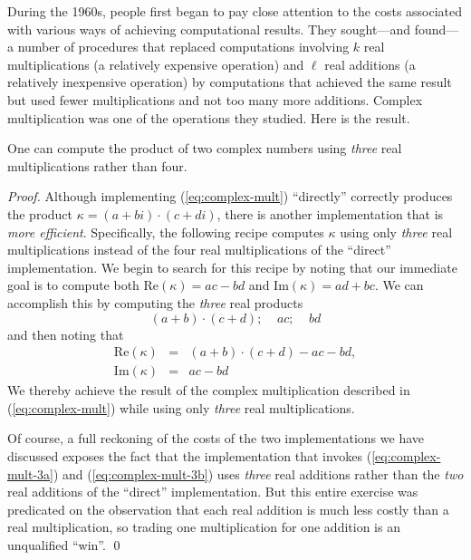 During the 1960s, people first began to pay close attention to the
costs associated with various ways of achieving computational results.
They sought---and found---a number of procedures that replaced
computations involving $k$ real multiplications (a relatively
expensive operation) and $\ell$ real additions (a relatively
inexpensive operation) by computations that achieved the same result
but used fewer multiplications and not too many more additions.
Complex multiplication was one of the operations they studied.  Here
is the result.


\begin{prop}
\label{thm:complex-mult-3real}
One can compute the product of two complex numbers using {\em three}
real multiplications rather than four.
\end{prop}

\begin{proof}
Although implementing (\ref{eq:complex-mult}) ``directly'' correctly
produces the product $\kappa = (a+bi) \cdot (c+di)$, there is another
implementation that is {\em more efficient}.  Specifically, the
following recipe computes $\kappa$ using only {\em three} real
multiplications instead of the four real multiplications of the
``direct'' implementation.  We begin to search for this recipe by
noting that our immediate goal is to compute both Re$(\kappa) = ac-bd$
and Im$(\kappa) = ad+bc$.  We can accomplish this by computing the
{\em three} real products
\begin{equation}
\label{eq:complex-mult-3a}
(a+b) \cdot (c+d); \ \ \ \ \
ac;  \ \ \ \ \ bd
\end{equation}
and then noting that
\begin{equation}
\label{eq:complex-mult-3b}
\begin{array}{lcl}
\mbox{Re}(\kappa) & = & (a+b) \cdot (c+d) - ac -bd, \\
\mbox{Im}(\kappa) & = & ac -bd
\end{array}
\end{equation}
We thereby achieve the result of the complex multiplication described
in (\ref{eq:complex-mult}) while using only {\em three} real
multiplications.

Of course, a full reckoning of the costs of the two implementations we
have discussed exposes the fact that the implementation that invokes
(\ref{eq:complex-mult-3a}) and (\ref{eq:complex-mult-3b}) uses {\em
  three} real additions rather than the {\em two} real additions of
the ``direct'' implementation.  But this entire exercise was
predicated on the observation that each real addition is much less
costly than a real multiplication, so trading one multiplication for
one addition is an unqualified ``win''.  \qed
\end{proof}


